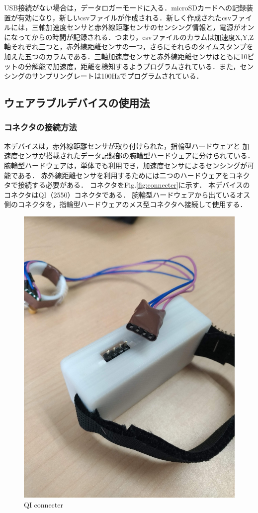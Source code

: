 USB接続がない場合は，データロガーモードに入る．microSDカードへの記録装置が有効になり，新しいcsvファイルが作成される．新しく作成されたcsvファイルには，三軸加速度センサと赤外線距離センサのセンシング情報と，電源がオンになってからの時間が記録される．つまり，csvファイルのカラムは加速度X,Y,Z軸それぞれ三つと，赤外線距離センサの一つ，さらにそれらのタイムスタンプを加えた五つのカラムである．三軸加速度センサと赤外線距離センサはともに10ビットの分解能で加速度，距離を検知するようプログラムされている．また，センシングのサンプリングレートは100Hzでプログラムされている．

\subsection{ウェアラブルデバイスの使用法}
\subsubsection*{コネクタの接続方法}
本デバイスは，赤外線距離センサが取り付けられた，指輪型ハードウェアと
加速度センサが搭載されたデータ記録部の腕輪型ハードウェアに分けられている．
腕輪型ハードウェアは，単体でも利用でき，加速度センサによるセンシングが可能である．
赤外線距離センサを利用するためには二つのハードウェアをコネクタで接続する必要がある．
コネクタをFig.\ref{fig:connecter}に示す．
本デバイスのコネクタはQI（2550）コネクタである．
腕輪型ハードウェアから出ているオス側のコネクタを，指輪型ハードウェアのメス型コネクタへ接続して使用する．
\begin{figure}[H]
  \centering
  \includegraphics[width=0.5\linewidth]{fig/connecter.jpg}
  \caption{QI connecter}
  \label{fig:QI connecter}
\end{figure}


